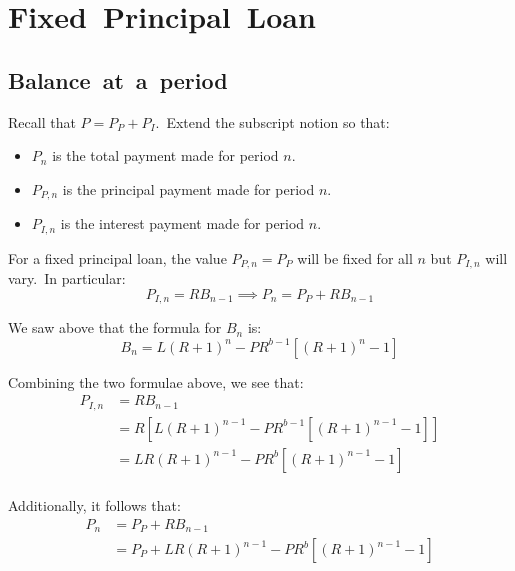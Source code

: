 
\section{Fixed~Principal~Loan}\label{sec:fixed-principal-loan}


\subsection{Balance~at~a~period}\label{subsec:fpl-balance-at-n}

Recall that \(P = P_{P} + P_{I}\).\ Extend the subscript notion so that:
\begin{itemize}
    \item \(P_{n}\) is the total payment made for period \(n\).
    \item \(P_{P, n}\) is the principal payment made for period \(n\).
    \item \(P_{I, n}\) is the interest payment made for period \(n\).
\end{itemize}

For a fixed principal loan, the value \(P_{P, n} = P_{P}\) will be fixed for all \(n\) but \(P_{I, n}\) will vary.\ In particular:
\begin{equation*}
    P_{I, n} = RB_{n - 1} \implies P_{n} = P_{P} + RB_{n - 1}
\end{equation*}

We saw above that the formula for \(B_{n}\) is:
\begin{equation*}
    B_{n} = L(R + 1)^{n} - PR^{b - 1}\left[(R + 1)^{n} - 1\right]
\end{equation*}

Combining the two formulae above, we see that:
\begin{equation*}
    \begin{split}
        P_{I, n} & = RB_{n - 1}\\
        & = R\left[ L(R + 1)^{n - 1} - PR^{b - 1}\left[(R + 1)^{n - 1} - 1\right] \right]\\
        & = LR(R + 1)^{n - 1} - PR^{b}\left[(R + 1)^{n - 1} - 1\right]\\
    \end{split}
\end{equation*}

Additionally, it follows that:
\begin{equation*}
    \begin{split}
        P_{n} & = P_{P} + RB_{n - 1}\\
        & = P_{P} +  LR(R + 1)^{n - 1} - PR^{b}\left[(R + 1)^{n - 1} - 1\right]\\
    \end{split}
\end{equation*}

